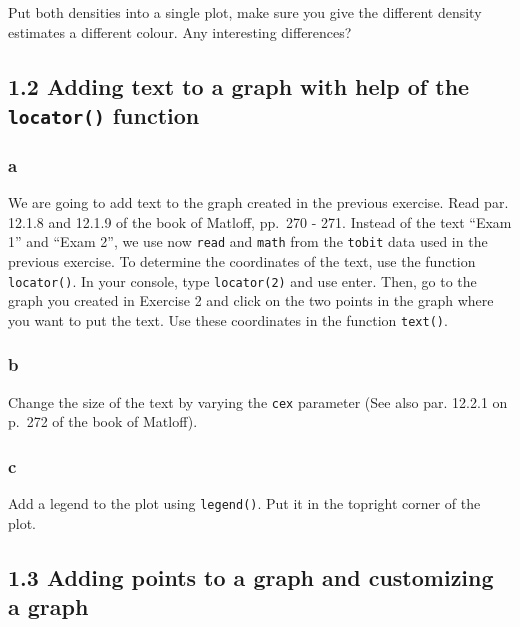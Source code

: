 \documentclass[]{article}
\begin{document}
Put both densities into a single plot, make sure you give the different
density estimates a different colour. Any interesting differences?

\hypertarget{adding-text-to-a-graph-with-help-of-the-locator-function}{%
\subsection{\texorpdfstring{1.2 Adding text to a graph with help of the
\texttt{locator()}
function}{1.2 Adding text to a graph with help of the locator() function}}\label{adding-text-to-a-graph-with-help-of-the-locator-function}}

\hypertarget{a-1}{%
\subsubsection{a}\label{a-1}}

We are going to add text to the graph created in the previous exercise.
Read par. 12.1.8 and 12.1.9 of the book of Matloff, pp.~270 - 271.
Instead of the text ``Exam 1'' and ``Exam 2'', we use now \texttt{read}
and \texttt{math} from the \texttt{tobit} data used in the previous
exercise. To determine the coordinates of the text, use the function
\texttt{locator()}. In your console, type \texttt{locator(2)} and use
enter. Then, go to the graph you created in Exercise 2 and click on the
two points in the graph where you want to put the text. Use these
coordinates in the function \texttt{text()}.

\hypertarget{b-1}{%
\subsubsection{b}\label{b-1}}

Change the size of the text by varying the \texttt{cex} parameter (See
also par. 12.2.1 on p.~272 of the book of Matloff).

\hypertarget{c-1}{%
\subsubsection{c}\label{c-1}}

Add a legend to the plot using \texttt{legend()}. Put it in the topright
corner of the plot.

\hypertarget{adding-points-to-a-graph-and-customizing-a-graph}{%
\subsection{1.3 Adding points to a graph and customizing a
graph}\label{adding-points-to-a-graph-and-customizing-a-graph}}
\end{document}
